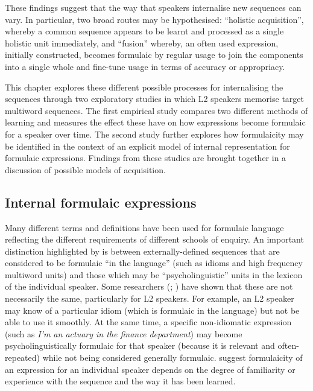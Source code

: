 \documentclass[output=paper]{langscibook}
\begin{document}
These findings suggest that the way that speakers internalise new sequences can vary. In particular, two broad routes may be hypothesised: ``holistic acquisition'', whereby a common sequence appears to be learnt and processed as a single holistic unit immediately, and ``fusion'' whereby, an often used expression, initially constructed, becomes formulaic by regular usage to join the components into a single whole and fine-tune usage in terms of accuracy or appropriacy. 

This chapter explores these different possible processes for internalising the sequences through two exploratory studies in which L2 speakers memorise target multiword sequences. The first empirical study compares two different methods of learning and measures the effect these have on how expressions become formulaic for a speaker over time. The second study further explores how formulaicity may be identified in the context of an explicit model of internal representation for formulaic expressions. Findings from these studies are brought together in a discussion of possible models of acquisition. 

\subsection{Internal formulaic expressions}\label{sec:cutler:1.2}

Many different terms and definitions have been used for formulaic language reflecting the different requirements of different schools of enquiry. An important distinction highlighted by \citet{Wray2008} is between externally-defined sequences that are considered to be formulaic ``in the language'' (such as idioms and high frequency multiword units) and those which may be ``psycholinguistic'' units in the lexicon of the individual speaker. Some researchers (\citealt{Dahlmann2009}; \citealt{Erman2007}) have shown that these are not necessarily the same, particularly for L2 speakers. For example, an L2 speaker may know of a particular idiom (which is formulaic in the language) but not be able to use it smoothly. At the same time, a specific non-idiomatic expression (such as \textit{I’m an actuary in the finance department}) may become psycholinguistically formulaic for that speaker (because it is relevant and often-repeated) while not being considered generally formulaic. \citet{TabossiEtAl2009} suggest formulaicity of an expression for an individual speaker depends on the degree of familiarity or experience with the sequence and the way it has been learned.
\end{document}
